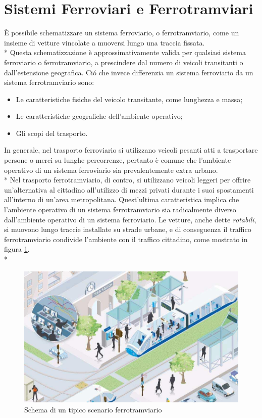 \section{Sistemi Ferroviari e Ferrotramviari}
\`E possibile schematizzare un sistema ferroviario, o ferrotramviario, come un insieme di vetture vincolate a muoversi lungo una traccia fissata.\\*
Questa schematizzazione \`e approssimativamente valida per qualsiasi sistema ferroviario o ferrotramviario, a prescindere dal numero di veicoli transitanti o dall'estensione geografica. Ci\'o che invece differenzia un sistema ferroviario da un sistema ferrotramviario sono:
\begin{itemize}
		\item Le caratteristiche fisiche del veicolo transitante, come lunghezza e massa;
		\item Le caratteristiche geografiche dell'ambiente operativo;
		\item Gli scopi del trasporto.
\end{itemize}
In generale, nel trasporto ferroviario si utilizzano veicoli pesanti atti a trasportare persone o merci su lunghe percorrenze, pertanto \`e comune che l'ambiente operativo di un sistema ferroviario sia prevalentemente extra urbano.\\*
Nel trasporto ferrotramviario, di contro, si utilizzano veicoli leggeri per offrire un'alternativa al cittadino all'utilizzo di mezzi privati durante i suoi spostamenti all'interno di un'area metropolitana. Quest'ultima caratteristica implica che l'ambiente operativo di un sistema ferrotramviario sia radicalmente diverso dall'ambiente operativo di un sistema ferroviario. Le vetture, anche dette \emph{rotabili}, si muovono lungo traccie installate su strade urbane, e di conseguenza il traffico ferrotramviario condivide l'ambiente con il traffico cittadino, come mostrato in figura \ref{fig:tramschema}.\\*
\begin{figure}[h]
		\centering
		\includegraphics[width=0.7\linewidth]{img/twschema}
		\caption{Schema di un tipico scenario ferrotramviario}
		\label{fig:tramschema}
\end{figure}
